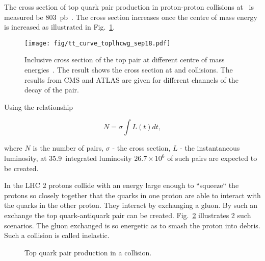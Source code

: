 The cross section of top quark pair production in proton-proton collisions at ~\TeV is measured be 803~pb~\cite{Sirunyan:2018goh}. The cross section increases once the centre of mass energy is increased as illustrated in Fig.~\ref{fig:tt_curve_toplhcwg_sep18}.

\begin{figure}[hbtp]

  \centering
  \texttt{[image: fig/tt\_curve\_toplhcwg\_sep18.pdf]}
  \caption{Inclusive cross section of the top pair at different centre of mass energies~\cite{twiki:tt_curve_toplhcwg_sep18}. The result shows the cross section at \Pp\Pp and \Pp\Pap collisions. The results from CMS and ATLAS are given for different channels of the decay of the \ttbar pair.}
  \label{fig:tt_curve_toplhcwg_sep18}
  
\end{figure}

Using the relationship

\begin{equation}
N=\sigma\int L(t)dt,
\end{equation}

where $N$ is the number of \ttbar pairs, $\sigma$ - the \ttbar cross section, $L$ - the instantaneous luminosity, at 35.9~\fbinv integrated luminosity $26.7\times10^{6}$ of such pairs are expected to be created. 

In the LHC 2 protons collide with an energy large enough to ``squeeze`` the protons so closely together that the quarks in one proton are able to interact with the quarks in the other proton. They interact by exchanging a gluon. By such an exchange the top quark-antiquark pair can be created. Fig.~\ref{fig:top_quark_productions} illustrates 2 such scenarios. The gluon exchanged is so energetic as to smash the proton into debris. Such a collision is called inelastic.

\begin{figure}[h!]
  \centering
  \def\twidth{0.3}
  \hfil

  \caption{Top quark pair production in a \Pp\Pp collision.}
  \label{fig:top_quark_productions}
\end{figure}

